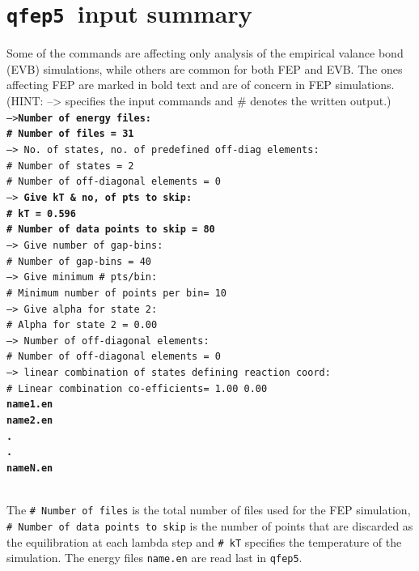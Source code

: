 \documentclass[a4paper,12pt]{article}
\newcommand{\qfep}{\texttt{qfep5}}
\begin{document}
\section{\qfep\ input summary}

Some of the commands are affecting only analysis of the empirical
valance bond (EVB) simulations, while others are common for both
FEP and EVB. The ones affecting FEP are marked in bold text and
are of concern in FEP simulations.\\ (HINT: --> specifies the
input commands and \# denotes the written output.)\\

\noindent\texttt{-->\textbf{Number of energy files:\\
\# Number of files                 =    31}\\
--> No. of states, no. of predefined off-diag elements: \\
\# Number of states                 =     2\\
\# Number of off-diagonal elements =     0\\
--> \textbf{Give kT \& no, of pts to skip:}\\
\textbf{\# kT                              = 0.596}\\
\textbf{\# Number of data points to skip   =    80}\\
--> Give number of gap-bins: \\
\# Number of gap-bins              =    40\\
--> Give minimum \# pts/bin: \\
\# Minimum number of points per bin=    10\\
--> Give alpha for state  2:\\
\# Alpha for state  2              =  0.00\\
--> Number of off-diagonal elements:\\
\# Number of off-diagonal elements =     0\\
--> linear combination of states defining reaction coord: \\
\# Linear combination co-efficients=  1.00  0.00\\
\textbf{name1.en\\
name2.en\\
.\\
.\\
nameN.en\\}
}

The \texttt{\# Number of files} is the total number of files used
for the FEP simulation, \texttt{\# Number of data points to skip}
is the number of points that are discarded as the equilibration at
each lambda step and \texttt{\# kT} specifies the temperature of
the simulation. The energy files \texttt{name.en} are read last in
\qfep.
\end{document}
